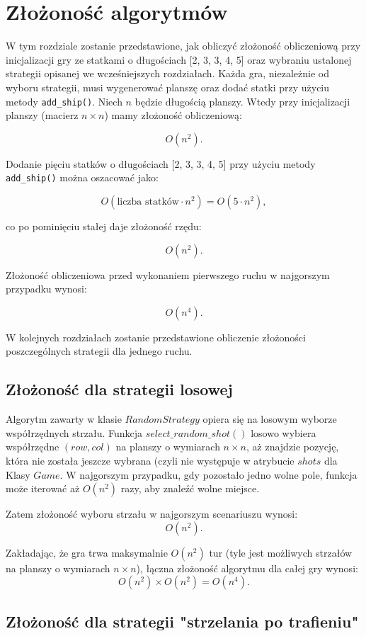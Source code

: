 \documentclass[magisterska]{pracadypl}
\begin{document}
{\chapter{Złożoność algorytmów}
W tym rozdziale zostanie przedstawione, jak obliczyć złożoność obliczeniową przy inicjalizacji gry ze statkami o długościach [2, 3, 3, 4, 5] oraz wybraniu ustalonej strategii opisanej we wcześniejszych rozdziałach. Każda gra, niezależnie od wyboru strategii, musi wygenerować planszę oraz dodać statki przy użyciu metody \texttt{add\_ship()}. Niech $n$ będzie długością planszy. Wtedy przy inicjalizacji planszy (macierz $n \times n$) mamy złożoność obliczeniową:

$$
O(n^2).
$$

Dodanie pięciu statków o długościach [2, 3, 3, 4, 5] przy użyciu metody \texttt{add\_ship()} można oszacować jako:

$$
O(\text{liczba statków} \cdot n^2) = O(5 \cdot n^2),
$$

co po pominięciu stałej daje złożoność rzędu:

$$
O(n^2).
$$

Złożoność obliczeniowa przed wykonaniem pierwszego ruchu w najgorszym przypadku wynosi:

$$
O(n^4).
$$

W kolejnych rozdziałach zostanie przedstawione obliczenie złożoności poszczególnych strategii dla jednego ruchu.
\section{Złożoność dla strategii losowej}
Algorytm zawarty w klasie $RandomStrategy$ opiera się na losowym wyborze współrzędnych strzału. Funkcja $select\_random\_shot()$ losowo wybiera współrzędne $(row, col)$ na planszy o wymiarach $n \times n$, aż znajdzie pozycję, która nie została jeszcze wybrana (czyli nie występuje w atrybucie $shots$ dla Klasy $Game$. W najgorszym przypadku, gdy pozostało jedno wolne pole, funkcja może iterować aż $O(n^2)$ razy, aby znaleźć wolne miejsce.

Zatem złożoność wyboru strzału w najgorszym scenariuszu wynosi:
$$
O(n^2).
$$

Zakładając, że gra trwa maksymalnie $O(n^2)$ tur (tyle jest możliwych strzałów na planszy o wymiarach $n \times n$), łączna złożoność algorytmu dla całej gry wynosi:
$$
O(n^2) \times O(n^2) = O(n^4).
$$
\section{Złożoność dla strategii "strzelania po trafieniu"}
}
\end{document}
